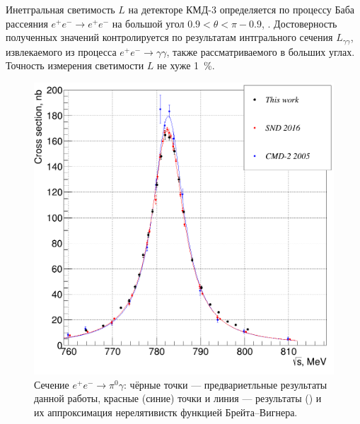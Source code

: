 Инетгральная светимость $L$ на детекторе КМД-3 определяется по процессу Баба рассеяния
$e^+e^- \to e^+e^-$ на большой угол $0.9 < \theta < \pi - 0.9$,
\cite{Ryzhenenkov:2017xqu}.
Достоверность полученных значений контролируется по результатам интгрального сечения $L_{\gamma \gamma}$,
извлекаемого из процесса $e^+e^- \to \gamma \gamma$,
также рассматриваемого в больших углах.
Точность измерения светимости $L$ не хуже \SI{1}{\percent}.

\begin{figure}[htbp]
	\begin{minipage}[t]{.48\textwidth}
		\centering
		\includegraphics[width=\textwidth]{img/my_pi0g_cross_section_for_pseudodisser.png}
		\caption{Сечение $e^+ e^- \to \pi^0 \gamma$:
			чёрные точки --- предвариетльные результаты данной работы,
			красные (синие) точки и линия --- результаты \cite{Achasov:2016bfr} (\cite{Akhmetshin:2004gw})
			и их аппроксимация нерелятивистк функцией Брейта--Вигнера.}\label{fig:cs_pi0g_mine}
	\end{minipage}
	\hfill
	\begin{minipage}[t]{.48\textwidth}
		\centering

\end{minipage}
\end{figure}
